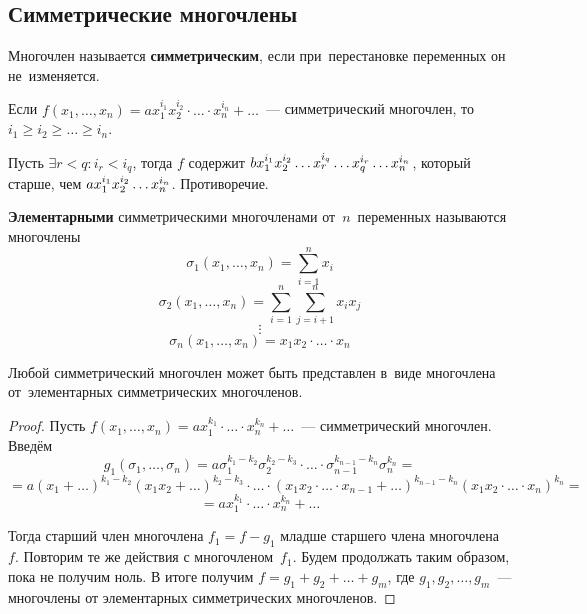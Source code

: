 \subsection{Симметрические многочлены}
Многочлен называется \textbf{симметрическим}, если при~перестановке переменных он не~изменяется.

\begin{statement}
Если $f(x_1, \ldots, x_n) = a x_1^{i_1} x_2^{i_2} \cdot \ldots \cdot x_n^{i_n} + \ldots$~--- симметрический многочлен, то $i_1 \geqslant i_2 \geqslant \ldots \geqslant i_n$.
\end{statement}
\begin{proofcontra}
Пусть $\exists r < q \colon i_r < i_q$, тогда $f$ содержит
$b x_1^{i_1} \* x_2^{i_2} \* \ldots \* x_r^{i_q} \* \ldots \* x_q^{i_r} \* \ldots \* x_n^{i_n}$, который старше, чем
$a x_1^{i_1} \* x_2^{i_2} \* \ldots \* x_n^{i_n}$. Противоречие.
\end{proofcontra}

\textbf{Элементарными} симметрическими многочленами от~$n$~переменных называются многочлены
\begin{equation*}
\sigma_1(x_1, \ldots, x_n) = \sum_{i=1}^n x_i
\end{equation*}
\begin{equation*}
\sigma_2(x_1, \ldots, x_n) = \sum_{i=1}^n \sum_{j=i+1}^n x_i x_j
\end{equation*}
\begin{equation*}
\vdots
\end{equation*}
\begin{equation*}
\sigma_n(x_1, \ldots, x_n) = x_1 x_2 \cdot \ldots \cdot x_n 
\end{equation*}

\begin{theorem}
Любой симметрический многочлен может быть представлен в~виде многочлена от~элементарных симметрических многочленов.
\end{theorem}
\begin{proof}
Пусть $f(x_1, \ldots, x_n) = a x_1^{k_1} \cdot \ldots \cdot x_n^{k_n} + \ldots$~--- симметрический многочлен. Введём
\begin{equation*}
g_1(\sigma_1, \ldots, \sigma_n) = a \sigma_1^{k_1 - k_2} \sigma_2^{k_2 - k_3} \cdot \ldots \cdot \sigma_{n-1}^{k_{n-1} - k_n} \sigma_n^{k_n} =
\end{equation*}
\begin{equation*}
= a(x_1 + \ldots)^{k_1 - k_2} (x_1 x_2 + \ldots)^{k_2 - k_3} \cdot \ldots \cdot (x_1 x_2 \cdot \ldots \cdot x_{n-1} + \ldots)^{k_{n-1} - k_n} (x_1 x_2 \cdot \ldots \cdot x_n)^{k_n} =
\end{equation*}
\begin{equation*}
= a x_1^{k_1} \cdot \ldots \cdot x_n^{k_n} + \ldots
\end{equation*}

Тогда старший член многочлена $f_1 = f - g_1$ младше старшего члена многочлена~$f$.
Повторим те же действия с многочленом~$f_1$.
Будем продолжать таким образом, пока не получим ноль.
В итоге получим $f = g_1 + g_2 + \ldots + g_m$, где $g_1, g_2, \ldots, g_m$~--- многочлены от элементарных симметрических многочленов.
\end{proof}